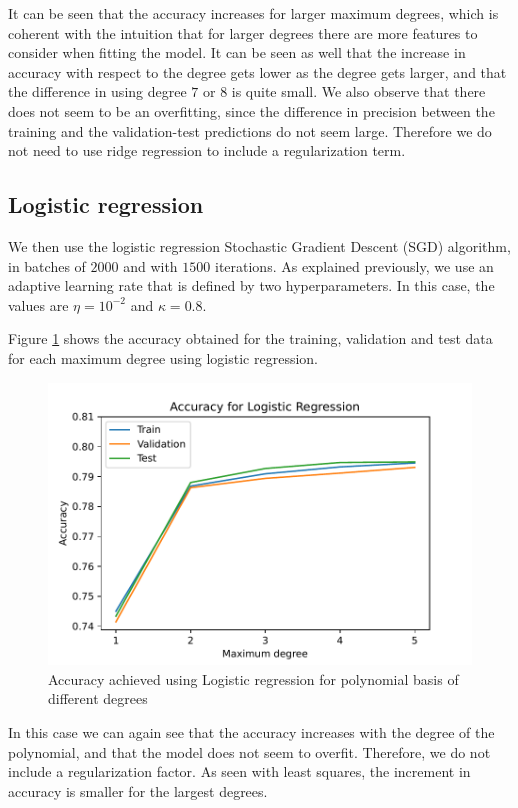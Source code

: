 \documentclass[10pt,conference,compsocconf]{IEEEtran}
\begin{document}
    It can be seen that the accuracy increases for larger maximum degrees, which is coherent with the intuition that for larger degrees there are more features to consider when fitting the model. It can be seen as well that the increase in accuracy with respect to the degree gets lower as the degree gets larger, and that the difference in using degree $7$ or $8$ is quite small. We also observe that there does not seem to be an overfitting, since the difference in precision between the training and the validation-test predictions do not seem large. Therefore we do not need to use ridge regression to include a regularization term.
  \subsection{Logistic regression} %
  \label{sub:logistic_regression}
    We then use the logistic regression Stochastic Gradient Descent (SGD) algorithm, in batches of $2000$ and with $1500$ iterations. As explained previously, we use an adaptive learning rate that is defined by two hyperparameters. In this case, the values are $\eta = 10^{-2}$ and $\kappa = 0.8$.

    Figure \ref{fig:2LRprec} shows the accuracy obtained for the training, validation and test data for each maximum degree using logistic regression.

    \begin{figure}[htp]
      \centering
      \includegraphics[width=.6\textwidth]{2LRprec}
      \caption{Accuracy achieved using Logistic regression for polynomial basis of different degrees}
      \label{fig:2LRprec}
    \end{figure}

    In this case we can again see that the accuracy increases with the degree of the polynomial, and that the model does not seem to overfit. Therefore, we do not include a regularization factor. As seen with least squares, the increment in accuracy is smaller for the largest degrees.
\end{document}
